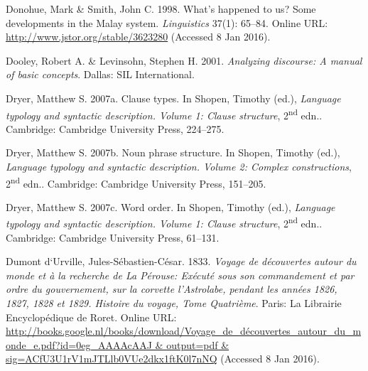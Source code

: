 \begin{styleCitaviBibliographyEntry}
Donohue, Mark \& Smith, John C. 1998. What’s happened to us? Some developments in the Malay  system. \textit{ Linguistics} 37(1): 65–84. Online URL: \url{http://www.jstor.org/stable/3623280} (Accessed 8 Jan 2016).
\end{styleCitaviBibliographyEntry}

\begin{styleCitaviBibliographyEntry}
Dooley, Robert A. \& Levinsohn, Stephen H. 2001. \textit{Analyzing discourse: A manual of basic concepts}. Dallas: SIL International.
\end{styleCitaviBibliographyEntry}

\begin{styleCitaviBibliographyEntry}
Dryer, Matthew S. 2007a. Clause types. In Shopen, Timothy (ed.), \textit{Language typology and syntactic description. Volume 1: Clause structure}, 2\textsuperscript{nd} edn.. Cambridge: Cambridge University Press, 224–275.
\end{styleCitaviBibliographyEntry}

\begin{styleCitaviBibliographyEntry}
Dryer, Matthew S. 2007b. Noun phrase structure. In Shopen, Timothy (ed.), \textit{Language typology and syntactic description. Volume 2: Complex constructions}, 2\textsuperscript{nd} edn.. Cambridge: Cambridge University Press, 151–205.
\end{styleCitaviBibliographyEntry}

\begin{styleCitaviBibliographyEntry}
Dryer, Matthew S. 2007c. Word order. In Shopen, Timothy (ed.), \textit{Language typology and syntactic description. Volume 1: Clause structure}, 2\textsuperscript{nd} edn.. Cambridge: Cambridge University Press, 61–131.
\end{styleCitaviBibliographyEntry}

\begin{styleCitaviBibliographyEntry}
Dumont d‘Urville, Jules-Sébastien-César. 1833. \textit{Voyage de d\'{e}couvertes autour du monde et \`{a} la recherche de La P\'{e}rouse: Ex\'{e}cut\'{e} sous son commandement et par ordre du gouvernement, sur la corvette l’Astrolabe, pendant les ann\'{e}es 1826, 1827, 1828 et 1829. Histoire du voyage, Tome Quatrième}. Paris: La Librairie Encyclopédique de Roret. Online URL: \url{http://books.google.nl/books/download/Voyage_de_découvertes_autour_du_monde_e.pdf?id=0eg_AAAAcAAJ & output=pdf & sig=ACfU3U1rV1mJTLlb0VUe2dkx1ftK0l7nNQ} (Accessed 8 Jan 2016).
\end{styleCitaviBibliographyEntry}

